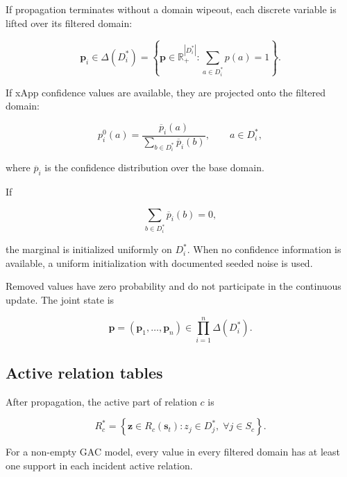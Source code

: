 \documentclass[pdflatex,sn-mathphys-num,iicol,oneside]{sn-jnl}
\begin{document}
If propagation terminates without a domain wipeout, each discrete
variable is lifted over its filtered domain:

\begin{equation}
\bm{p}_i
\in
\Delta(D_i^{*})
=
\left\{
\bm{p}\in\mathbb{R}_{+}^{|D_i^{*}|}:
\sum_{a\in D_i^{*}}p(a)=1
\right\}.
\end{equation}

If xApp confidence values are available, they are projected onto the
filtered domain:

\begin{equation}
p_i^{0}(a)
=
\frac{\overline{p}_i(a)}
{\displaystyle
\sum_{b\in D_i^{*}}\overline{p}_i(b)},
\qquad
a\in D_i^{*},
\label{eq:projected-initialization}
\end{equation}

where $\overline{p}_i$ is the confidence distribution over the base
domain.

If

\begin{equation}
\sum_{b\in D_i^{*}}\overline{p}_i(b)=0,
\end{equation}

the marginal is initialized uniformly on $D_i^{*}$. When no
confidence information is available, a uniform initialization with
documented seeded noise is used.

Removed values have zero probability and do not participate in the
continuous update. The joint state is

\begin{equation}
\bm{p}
=
(\bm{p}_1,\ldots,\bm{p}_n)
\in
\prod_{i=1}^{n}\Delta(D_i^{*}).
\end{equation}

\subsection{Active relation tables}

After propagation, the active part of relation $c$ is

\begin{equation}
R_c^{*}
=
\left\{
\bm{z}\in R_c(\bm{s}_t):
z_j\in D_j^{*},
\;
\forall j\in S_c
\right\}.
\label{eq:active-relation}
\end{equation}

For a non-empty GAC model, every value in every filtered domain has at
least one support in each incident active relation.
\end{document}

